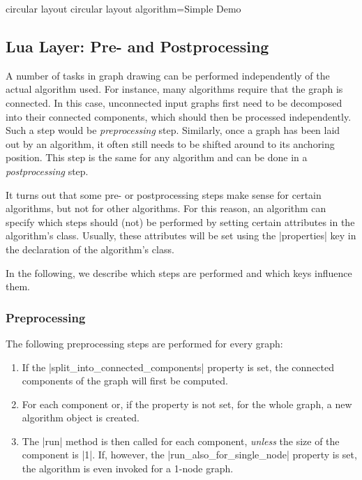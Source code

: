 \begin{codeexample}
  
\pgfgddeclarealgorithmkey
  {circular layout}
  {circular layout}
  {algorithm=Simple Demo}

\end{codeexample}




\subsection{Lua Layer: Pre- and Postprocessing}

A number of tasks in graph drawing can be performed independently of
the actual algorithm used. For instance, many algorithms require that
the graph is connected. In this case, unconnected input graphs first
need to be decomposed into their connected components, which should
then be processed independently. Such a step would be
\emph{preprocessing} step. Similarly, once a graph has been laid out
by an algorithm, it often still needs to be shifted around to its
anchoring position. This step is the same for any algorithm and can be
done in a \emph{postprocessing} step.

It turns out that some pre- or postprocessing steps make sense for
certain algorithms, but not for other algorithms. For this reason, an
algorithm can specify which steps should (not) be performed by setting
certain attributes in the algorithm's class. Usually, these attributes
will be set using the |properties| key in the declaration of the
algorithm's class.

In the following, we describe which steps are performed and which keys
influence them.


\subsubsection{Preprocessing}

The following preprocessing steps are performed for every graph:
\begin{enumerate}
\item If the |split_into_connected_components| property is set, the
  connected components of the graph will first be computed.
\item For each component or, if the property is not set, for the whole
  graph, a new algorithm object is created.
\item The |run| method is then called for each component,
  \emph{unless} the size of the component is |1|. If, however, the
  |run_also_for_single_node| property is set, the algorithm is even
  invoked for a 1-node graph.
\end{enumerate}

